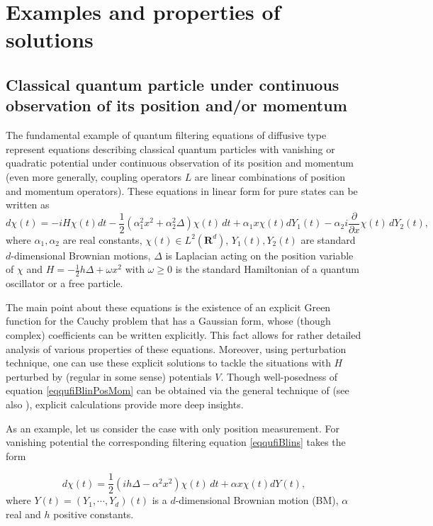 \documentclass[12pt]{article}
\def\R{\mathbf{R}}
\def\al{\alpha}
\def\pa{\partial}
\newcommand{\om}{\omega}
\newcommand{\De}{\Delta}
\begin{document}
\section{Examples and properties of solutions}
\label{secexamprop}

\subsection{Classical quantum particle under continuous observation of its position and/or momentum}

The fundamental example of quantum filtering equations of diffusive type represent equations describing
 classical quantum particles with vanishing or quadratic potential under continuous observation of its
  position and momentum (even more generally, coupling operators $L$ are linear combinations
  of position and momentum operators). These equations in linear form for pure states
 can be written as
\begin{equation}
\label{eqqufiBlinPosMom}
d\chi(t) =-iH\chi(t) dt -\frac12 (\al_1^2 x^2 +\al_2^2 \De)\chi(t)\,dt
+\al_1 x \chi(t) dY_1(t)-\al_2 i\frac{\pa}{\pa x} \chi(t) \, dY_2(t),
\end{equation}
where $\al_1,\al_2$ are real constants, $\chi(t) \in L^2(\R^d)$,
$Y_1(t),Y_2(t)$ are standard $d$-dimensional Brownian motions,
$\De$ is Laplacian acting on the position variable of $\chi$ and $H=-\frac12 h \De+\om x^2$
with $\om \ge 0$ is the standard Hamiltonian
of a quantum oscillator or a free particle.

The main point about these equations is the existence of an explicit Green function for the Cauchy problem that
has a Gaussian form, whose (though complex) coefficients can be written explicitly. This fact allows for rather
detailed analysis of various properties of these equations. Moreover, using perturbation technique,
one can use these explicit solutions to tackle the situations with $H$ perturbed by (regular in some sense) potentials $V$.
Though well-posedness of equation \eqref{eqqufiBlinPosMom} can be obtained via the general technique of
  \cite{Mora13} (see also \cite{Kol25b}), explicit calculations provide more deep insights.

As an example, let us consider the case with only position measurement.
For vanishing potential the corresponding filtering equation \eqref{eqqufiBlins} takes the form

\begin{equation}
\label{eqqufiBlinGa}
d\chi(t) =\frac12 (ih\De-\al^2 x^2) \chi(t) \,dt+\al x \chi(t) dY(t),
\end{equation}
where $Y(t)=(Y_1, \cdots, Y_d)(t)$ is a $d$-dimensional Brownian motion (BM),
$\al$ real and $h$ positive constants.
\end{document}
